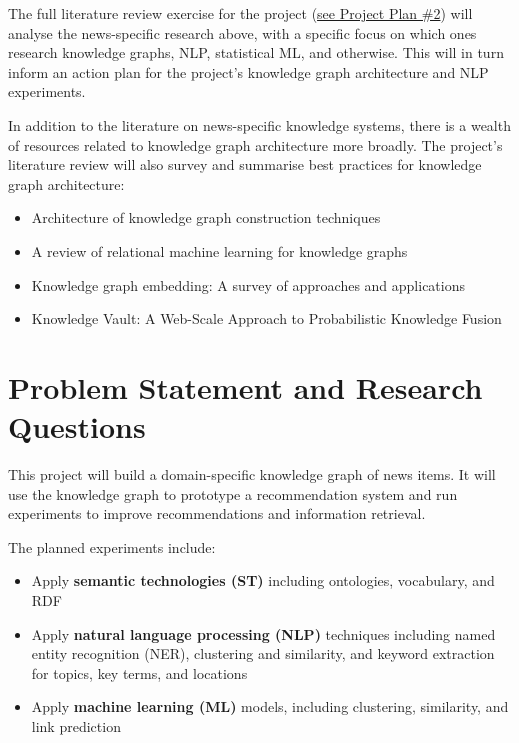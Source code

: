 \documentclass[11pt]{article}   	%
\begin{document}
The full literature review exercise for the project (\hyperref[sec:PropLiteratureReview]{see Project Plan \#2}) will analyse the news-specific research above, with a specific focus on which ones research knowledge graphs, NLP, statistical ML, and otherwise. This will in turn inform an action plan for the project's knowledge graph architecture and NLP experiments.

In addition to the literature on news-specific knowledge systems, there is a wealth of resources related to knowledge graph architecture more broadly. The project's literature review will also survey and summarise best practices for knowledge graph architecture:

\begin{itemize}
\item Architecture of knowledge graph construction techniques \cite{zhao2018architecture}
\item A review of relational machine learning for knowledge graphs \cite{nickel2015review}
\item Knowledge graph embedding: A survey of approaches and applications \cite{wang2017knowledge}
\item Knowledge Vault: A Web-Scale Approach to Probabilistic Knowledge Fusion \cite{45634}
\end{itemize}

\newpage
\section{Problem Statement and Research Questions}

This project will build a domain-specific knowledge graph of news items. It will use the knowledge graph to prototype a recommendation system and run experiments to improve recommendations and information retrieval.

The planned experiments include:

\begin{itemize}
\item Apply \textbf{semantic technologies (ST)} including ontologies, vocabulary, and RDF
\item Apply \textbf{natural language processing (NLP)} techniques including named entity recognition (NER), clustering and similarity, and keyword extraction for topics, key terms, and locations
\item Apply \textbf{machine learning (ML)} models, including clustering, similarity, and link prediction
\end{itemize}
\end{document}
